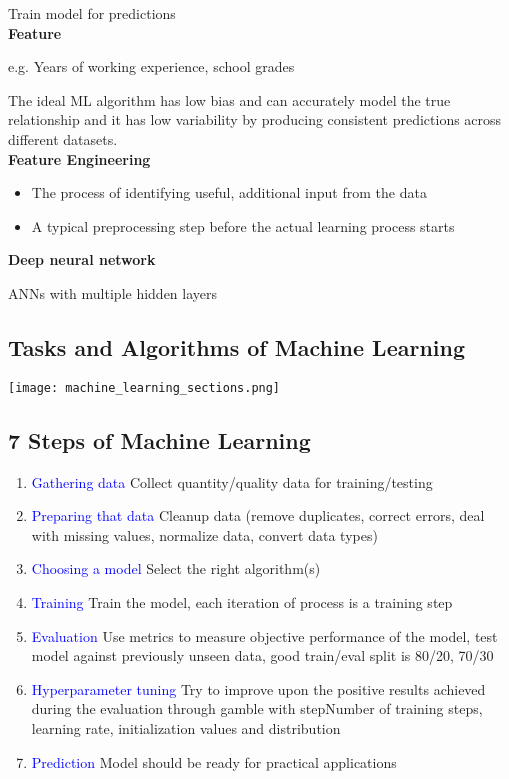 Train model for predictions \\

\textbf{Feature}

e.g. Years of working experience, school grades

The ideal ML algorithm has low bias and can accurately model the true relationship and it has low variability by producing consistent predictions across different datasets. \\

\textbf{Feature Engineering}
\begin{itemize}
    \item The process of identifying useful, additional input from the data
    \item A typical preprocessing step before the actual learning process starts
\end{itemize}
\vspace{10pt}
\textbf{Deep neural network}

ANNs with multiple hidden layers \\

\subsection{Tasks and Algorithms of Machine Learning}
\texttt{[image: machine\_learning\_sections.png]}

\subsection{7 Steps of Machine Learning}
\begin{enumerate}
    \item \textcolor{blue}{Gathering data} Collect quantity/quality data for training/testing
    \item \textcolor{blue}{Preparing that data} Cleanup data (remove duplicates, correct errors, deal with missing values, normalize data, convert data types)
    \item \textcolor{blue}{Choosing a model} Select the right algorithm(s)
    \item \textcolor{blue}{Training} Train the model, each iteration of process is a training step
    \item \textcolor{blue}{Evaluation} Use metrics to measure objective performance of the model, test model against previously unseen data, good train/eval split is 80/20, 70/30
    \item \textcolor{blue}{Hyperparameter tuning} Try to improve upon the positive results achieved during the evaluation through gamble with stepNumber of training steps, learning rate, initialization values and distribution
    \item \textcolor{blue}{Prediction} Model should be ready for practical applications
\end{enumerate}
